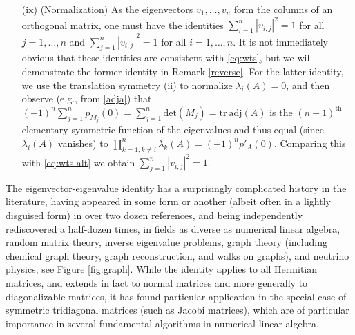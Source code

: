 \documentclass[12pt]{amsart}
\begin{document}
\begin{itemize}
\item[(ix)]  (Normalization)  As the eigenvectors $v_1,\dots,v_n$ form the columns of an orthogonal matrix, one must have the identities $\sum_{i=1}^n |v_{i,j}|^2 = 1$ for all $j=1,\dots,n$ and $\sum_{j=1}^n |v_{i,j}|^2 = 1$ for all $i=1,\dots,n$.  It is not immediately obvious that these identities are consistent with \eqref{eq:wts}, but we will demonstrate the former identity in Remark \ref{reverse}.  For the latter identity, we use the translation symmetry (ii) to normalize $\lambda_i(A)=0$, and then observe (e.g., from \eqref{adja}) that $(-1)^n \sum_{j=1}^n p_{M_j}(0) = \sum_{j=1}^n \mathrm{det}(M_j) = \mathrm{tr}\ \mathrm{adj}(A)$ is the $(n-1)^{\mathrm{th}}$ elementary symmetric function of the eigenvalues and thus equal (since $\lambda_i(A)$ vanishes) to $\prod_{k=1;k \neq i}^n \lambda_k(A) = (-1)^n p'_A(0)$.  Comparing this with \eqref{eq:wts-alt} we obtain $\sum_{j=1}^n |v_{i,j}|^2=1$.
\end{itemize}

The eigenvector-eigenvalue identity has a surprisingly complicated history in the literature, having appeared in some form or another (albeit often in a lightly disguised form) in over two dozen references, and being independently rediscovered a half-dozen times, in fields as diverse as numerical linear algebra, random matrix theory, inverse eigenvalue problems, graph theory (including chemical graph theory, graph reconstruction, and walks on graphs), and neutrino physics; see Figure \ref{fig:graph}.  While the identity applies to all Hermitian matrices, and extends in fact to normal matrices and more generally to diagonalizable matrices, it has found particular application in the special case of symmetric tridiagonal matrices (such as Jacobi matrices), which are of particular importance in several fundamental algorithms in numerical linear algebra.  
\end{document}
